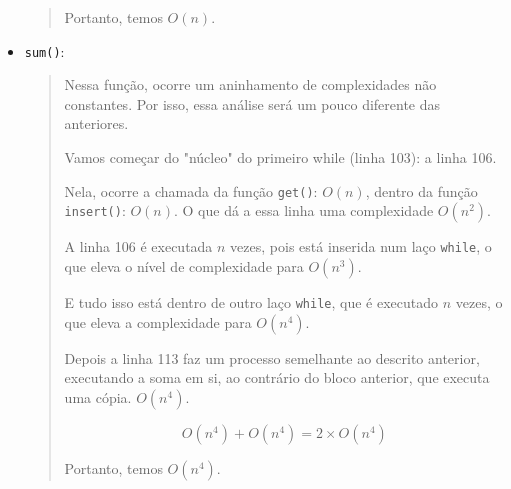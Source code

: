 \documentclass[12pt, letterpaper]{article}
\begin{document}
\begin{itemize}
\begin{quote}
						Portanto, temos $O(n)$.
					\end{quote}

				\item \verb|sum()|:
					\begin{quote}
						Nessa função, ocorre um aninhamento de complexidades não constantes. Por isso, essa análise será um pouco diferente das anteriores. 

						Vamos começar do "núcleo" do primeiro while (linha 103): a linha 106.

						Nela, ocorre a chamada da função \verb|get()|: $O(n)$, dentro da função \verb|insert()|: $O(n)$. O que dá a essa linha uma complexidade $O(n^2)$.

						A linha 106 é executada $n$ vezes, pois está inserida num laço \verb|while|, o que eleva o nível de complexidade para $O(n^3)$.

						E tudo isso está dentro de outro laço \verb|while|, que é executado $n$ vezes, o que eleva a complexidade para $O(n^4)$.

						Depois a linha 113 faz um processo semelhante ao descrito anterior, executando a soma em si, ao contrário do bloco anterior, que executa uma cópia. $O(n^4)$.

						\[ O(n^4) + O(n^4) = 2 \times O(n^4) \]

						Portanto, temos $O(n^4)$.
					\end{quote}

			\end{itemize}
	\pagebreak
	\printbibliography
\end{document}
